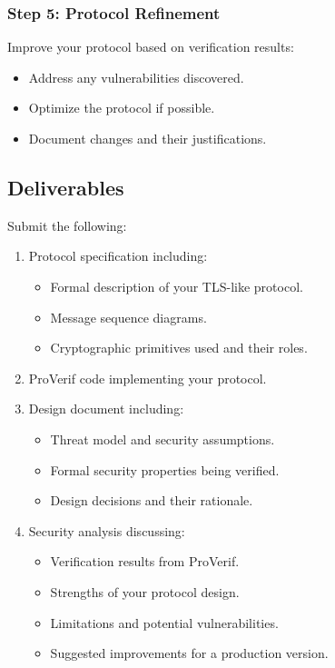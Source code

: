 \documentclass[10pt,a4paper,american]{article}
\begin{document}
\subsubsection*{Step 5: Protocol Refinement}
Improve your protocol based on verification results:
\begin{itemize}
	\item Address any vulnerabilities discovered.
	\item Optimize the protocol if possible.
	\item Document changes and their justifications.
\end{itemize}

\subsection*{Deliverables}
Submit the following:

\begin{enumerate}
	\item Protocol specification including:
	      \begin{itemize}
		      \item Formal description of your TLS-like protocol.
		      \item Message sequence diagrams.
		      \item Cryptographic primitives used and their roles.
	      \end{itemize}
	\item ProVerif code implementing your protocol.
	\item Design document including:
	      \begin{itemize}
		      \item Threat model and security assumptions.
		      \item Formal security properties being verified.
		      \item Design decisions and their rationale.
	      \end{itemize}
	\item Security analysis discussing:
	      \begin{itemize}
		      \item Verification results from ProVerif.
		      \item Strengths of your protocol design.
		      \item Limitations and potential vulnerabilities.
		      \item Suggested improvements for a production version.
	      \end{itemize}
\end{enumerate}
\end{document}
